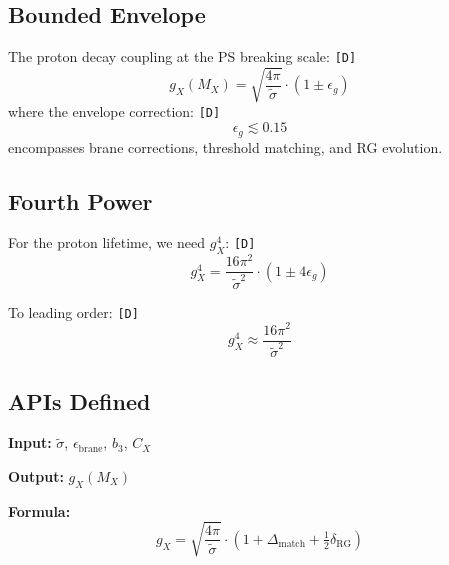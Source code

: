 \documentclass[11pt,a4paper]{article}
\newcommand{\tagD}{\textcolor{green!50!black}{\texttt{[D]}}}
\theoremstyle{definition}
\begin{document}
\subsection{Bounded Envelope}
\label{subsec:bounded-envelope}

\begin{derivbox}
The proton decay coupling at the PS breaking scale: \tagD{}
\begin{equation}
\label{eq:gx-interface-boxed}
\boxed{g_X(M_X) = \sqrt{\frac{4\pi}{\tilde{\sigma}}} \cdot (1 \pm \epsilon_g)}
\end{equation}
where the envelope correction: \tagD{}
\begin{equation}
\label{eq:epsilon-g-def}
\boxed{\epsilon_g \lesssim 0.15}
\end{equation}
encompasses brane corrections, threshold matching, and RG evolution.
\end{derivbox}

\subsection{Fourth Power}
\label{subsec:fourth-power}

For the proton lifetime, we need $g_X^4$: \tagD{}
\begin{equation}
\label{eq:gx-fourth}
g_X^4 = \frac{16\pi^2}{\tilde{\sigma}^2} \cdot (1 \pm 4\epsilon_g)
\end{equation}

To leading order: \tagD{}
\begin{equation}
\label{eq:gx-fourth-leading}
\boxed{g_X^4 \approx \frac{16\pi^2}{\tilde{\sigma}^2}}
\end{equation}

\subsection{APIs Defined}
\label{subsec:apis}

\begin{apibox}
\textbf{Input:} $\tilde{\sigma}$, $\epsilon_{\text{brane}}$, $b_3$, $C_X$

\textbf{Output:} $g_X(M_X)$

\textbf{Formula:}
\begin{equation}
\label{eq:api-gx1}
g_X = \sqrt{\frac{4\pi}{\tilde{\sigma}}} \cdot (1 + \Delta_{\text{match}} + \tfrac{1}{2}\delta_{\text{RG}})
\end{equation}
\end{apibox}
\end{document}
